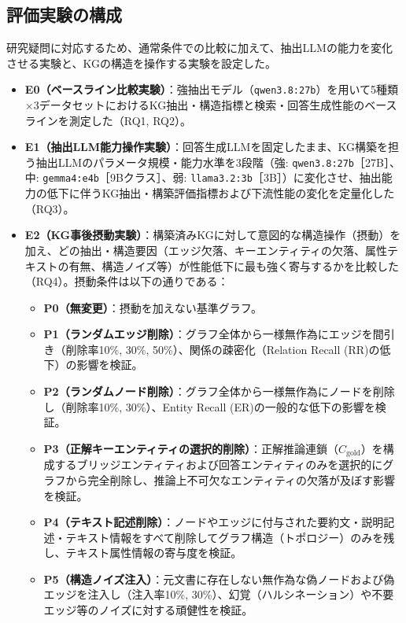 \documentclass[a4j,dvipdfmx]{jsarticle}
\begin{document}
\subsection{評価実験の構成}
研究疑問に対応するため、通常条件での比較に加えて、抽出LLMの能力を変化させる実験と、KGの構造を操作する実験を設定した。
\begin{itemize}
    \item \textbf{E0（ベースライン比較実験）}：強抽出モデル（\texttt{qwen3.8:27b}）を用いて5種類×3データセットにおけるKG抽出・構造指標と検索・回答生成性能のベースラインを測定した（RQ1, RQ2）。
    \item \textbf{E1（抽出LLM能力操作実験）}：回答生成LLMを固定したまま、KG構築を担う抽出LLMのパラメータ規模・能力水準を3段階（強: \texttt{qwen3.8:27b}［27B］、中: \texttt{gemma4:e4b}［9Bクラス］、弱: \texttt{llama3.2:3b}［3B］）に変化させ、抽出能力の低下に伴うKG抽出・構築評価指標および下流性能の変化を定量化した（RQ3）。
    \item \textbf{E2（KG事後摂動実験）}：構築済みKGに対して意図的な構造操作（摂動）を加え、どの抽出・構造要因（エッジ欠落、キーエンティティの欠落、属性テキストの有無、構造ノイズ等）が性能低下に最も強く寄与するかを比較した（RQ4）。摂動条件は以下の通りである：
    \begin{itemize}
        \item \textbf{P0（無変更）}：摂動を加えない基準グラフ。
        \item \textbf{P1（ランダムエッジ削除）}：グラフ全体から一様無作為にエッジを間引き（削除率10\%, 30\%, 50\%）、関係の疎密化（Relation Recall (RR)の低下）の影響を検証。
        \item \textbf{P2（ランダムノード削除）}：グラフ全体から一様無作為にノードを削除し（削除率10\%, 30\%）、Entity Recall (ER)の一般的な低下の影響を検証。
        \item \textbf{P3（正解キーエンティティの選択的削除）}：正解推論連鎖（$C_{\text{gold}}$）を構成するブリッジエンティティおよび回答エンティティのみを選択的にグラフから完全削除し、推論上不可欠なエンティティの欠落が及ぼす影響を検証。
        \item \textbf{P4（テキスト記述削除）}：ノードやエッジに付与された要約文・説明記述・テキスト情報をすべて削除してグラフ構造（トポロジー）のみを残し、テキスト属性情報の寄与度を検証。
        \item \textbf{P5（構造ノイズ注入）}：元文書に存在しない無作為な偽ノードおよび偽エッジを注入し（注入率10\%, 30\%）、幻覚（ハルシネーション）や不要エッジ等のノイズに対する頑健性を検証。
    \end{itemize}
\end{itemize}
\end{document}
